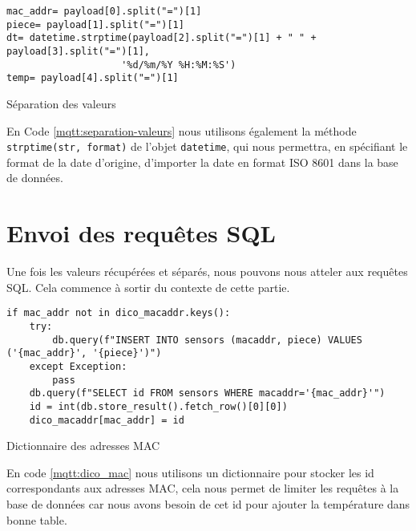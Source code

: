 \documentclass{article}
\begin{document}
    \begin{listing}[H]
        \begin{verbatim}
mac_addr= payload[0].split("=")[1]
piece= payload[1].split("=")[1]
dt= datetime.strptime(payload[2].split("=")[1] + " " + payload[3].split("=")[1],
                    '%d/%m/%Y %H:%M:%S')
temp= payload[4].split("=")[1]
        \end{verbatim}
        \caption{Séparation des valeurs}
        \label{mqtt:separation-valeurs}
    \end{listing}
    En Code \ref{mqtt:separation-valeurs} nous utilisons également la méthode \verb|strptime(str, format)| de l'objet \verb|datetime|, qui nous permettra, en spécifiant le format de la date d'origine, d'importer la date en format ISO 8601 dans la base de données.

    \section{Envoi des requêtes SQL}
    Une fois les valeurs récupérées et séparés, nous pouvons nous atteler aux requêtes SQL. Cela commence à sortir du contexte de cette partie.
    \begin{listing}[H]
        \begin{verbatim}
if mac_addr not in dico_macaddr.keys():
    try:
        db.query(f"INSERT INTO sensors (macaddr, piece) VALUES ('{mac_addr}', '{piece}')")
    except Exception:
        pass
    db.query(f"SELECT id FROM sensors WHERE macaddr='{mac_addr}'")
    id = int(db.store_result().fetch_row()[0][0])
    dico_macaddr[mac_addr] = id
        \end{verbatim}
        \caption{Dictionnaire des adresses MAC}
        \label{mqtt:dico_mac}
    \end{listing}
    En code \ref{mqtt:dico_mac} nous utilisons un dictionnaire pour stocker les id correspondants aux adresses MAC, cela nous permet de limiter les requêtes à la base de données car nous avons besoin de cet id pour ajouter la température dans bonne table.
\end{document}
